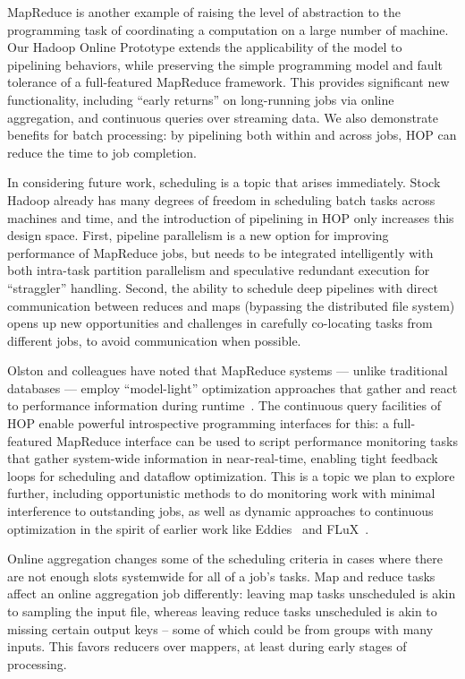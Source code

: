 MapReduce is another example of raising the level of abstraction to the programming
task of coordinating a computation on a large number of machine. 
Our Hadoop Online Prototype extends the applicability of the model to pipelining 
behaviors, while preserving the simple programming model and fault tolerance of a 
full-featured MapReduce framework.  This provides significant new functionality, 
including ``early returns'' on long-running jobs via online aggregation, and continuous 
queries over streaming data.  We also demonstrate benefits for batch processing:  by 
pipelining both within and across jobs, HOP can reduce the time to job completion. 

In considering future work, scheduling is a topic that arises immediately. Stock Hadoop 
already has many degrees of freedom in scheduling batch tasks across machines and time, 
and the introduction of pipelining in HOP only increases this design space.  First, pipeline 
parallelism is a new option for improving performance of MapReduce jobs, but needs to be 
integrated intelligently with both intra-task partition parallelism and speculative redundant 
execution for ``straggler'' handling. Second, the ability to schedule deep pipelines with direct
communication between reduces and maps (bypassing the distributed file system) opens up new 
opportunities and challenges in carefully co-locating tasks from different jobs, to avoid 
communication when possible.  

Olston and colleagues have noted that MapReduce systems --- unlike traditional
databases --- employ ``model-light'' optimization approaches that gather and
react to performance information during runtime~\cite{olston-usenix08}.  The
continuous query facilities of HOP enable powerful introspective programming
interfaces for this: a full-featured MapReduce interface can be used to script
performance monitoring tasks that gather system-wide information in
near-real-time, enabling tight feedback loops for scheduling and dataflow
optimization.  This is a topic we plan to explore further, including
opportunistic methods to do monitoring work with minimal interference to
outstanding jobs, as well as dynamic approaches to continuous optimization in
the spirit of earlier work like Eddies~\cite{eddies} and FLuX~\cite{flux-lb}.

Online aggregation changes some of the scheduling criteria in cases where there are not enough 
slots systemwide for all of a job's tasks.  Map and reduce tasks affect an online aggregation 
job differently: leaving map tasks unscheduled is akin to sampling the input file, whereas leaving 
reduce tasks unscheduled is akin to missing certain output keys -- some of which could be from 
groups with many inputs.  This favors reducers over mappers, at least during early stages of processing.  

